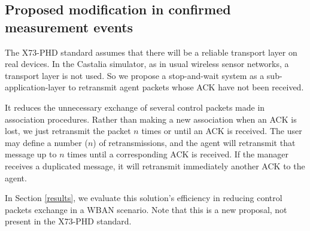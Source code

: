 \subsection{Proposed modification in confirmed measurement events}

The X73-PHD standard assumes that there will be a reliable transport layer on real devices. In the Castalia simulator, as in usual wireless sensor networks, a transport layer is not used. So we propose a stop-and-wait system as a sub-application-layer to retransmit agent packets whose ACK have not been received.

It reduces the unnecessary exchange of several control packets made in association procedures. Rather than making a new association when an ACK is lost, we just retransmit the packet $n$ times or until an ACK is received.
The user may define a number ($n$) of retransmissions, and the agent will retransmit that message up to $n$ times until a corresponding ACK is received. If the manager receives a duplicated message, it will retransmit immediately another ACK to the agent.

In Section \ref{results}, we evaluate this solution's efficiency in reducing control packets exchange in a WBAN scenario. Note that this is a new proposal, not present in the X73-PHD standard. 
